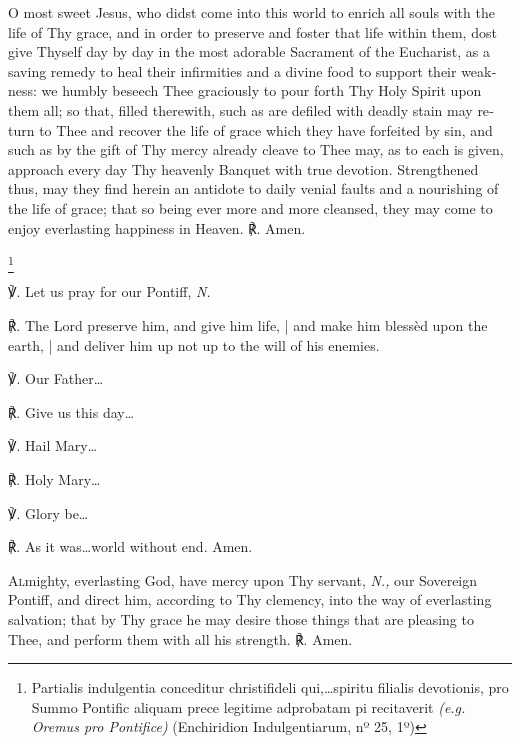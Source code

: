 \documentclass[11pt]{article}
\begin{document}
\begin{otherlanguage}{english}{\par}


\lettrine{O}{} most sweet Jesus, who didst come into this world to enrich all souls with the life of Thy grace, and in order to preserve and foster that life within them, dost give Thyself day by day in the most adorable Sacrament of the Eucharist, as a saving remedy to heal their infirmities and a divine food to support their weakness: we humbly beseech Thee graciously to pour forth Thy Holy Spirit upon them all; so that, filled therewith, such as are defiled with deadly stain may return to Thee and recover the life of grace which they have forfeited by sin, and such as by the gift of Thy mercy already cleave to Thee may, as to each is given, approach every day Thy heavenly Banquet with true devotion. Strengthened thus, may they find herein an antidote to daily venial faults and a nourishing of the life of grace; that so being ever more and more cleansed, they may come to enjoy everlasting happiness in Heaven. ℟. Amen.

\footnote{\raggedright{Partialis indulgentia conceditur christifideli qui,…spiritu filialis devotionis, pro Summo Pontific aliquam prece legitime adprobatam pi recitaverit \textit{(e.g. Oremus pro Pontifice)} (Enchiridion Indulgentiarum, nº 25, 1º)}}

\noindent ℣. Let us pray for our Pontiff, \textit{N.}

\noindent ℟. The Lord preserve him, and give him life, | and make him blessèd upon the earth, | and deliver him up not up to the will of his enemies.

\noindent ℣. Our Father…

\noindent ℟. Give us this day…

\noindent ℣. Hail Mary…

\noindent ℟. Holy Mary…

\noindent ℣.  Glory be…

\noindent ℟. As it was…world without end. Amen.


\lettrine{A}{l}mighty, everlasting God, have mercy upon Thy servant, \textit{N.,} our Sovereign Pontiff, and direct him, according to Thy clemency, into the way of everlasting salvation; that by Thy grace he may desire those things that are pleasing to Thee, and perform them with all his strength. ℟. Amen.


\end{otherlanguage}
\end{document}
